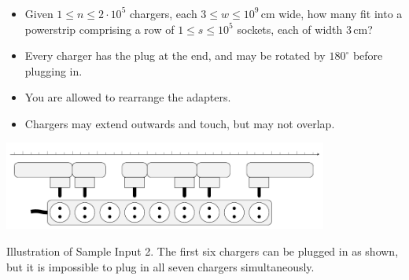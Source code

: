 \begin{frame}
  \frametitle{\problemtitle}

  \begin{itemize}
  \item Given $1\leq n\leq 2\cdot 10^5$ chargers, each $3\leq w\leq
    10^9\,\textrm{cm}$ wide, how many fit into a powerstrip
    comprising a row of $1\leq s\leq 10^5$ sockets, each of width $3\,\textrm{cm}$?
  \item Every charger has the plug at the end, and may be rotated by $180^\circ$ before plugging in.
  \item You are allowed to rearrange the adapters.
  \item Chargers may extend outwards and touch, but may not overlap.
  \end{itemize}

  \centering
  \includegraphics[width=0.8\textwidth]{powerstrip.pdf}

  \small
  Illustration of Sample Input 2.
  The first six chargers can be plugged in as shown, but it is impossible
  to plug in all seven chargers simultaneously.
\end{frame}
